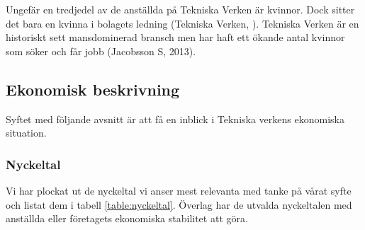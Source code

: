 \documentclass[10pt,a4paper]{article}
\begin{document}
Ungefär en tredjedel av de anställda på Tekniska Verken är
kvinnor. Dock sitter det bara en kvinna i bolagets ledning
(Tekniska Verken, ). Tekniska Verken är en historiskt sett mansdominerad bransch
men har haft ett ökande antal kvinnor som söker och får jobb
(Jacobsson S, 2013).  
\subsection{Ekonomisk beskrivning}
Syftet med följande avsnitt är att få en inblick i Tekniska verkens ekonomiska
situation.

\subsubsection{Nyckeltal}
Vi har plockat ut de nyckeltal vi anser mest relevanta med tanke på vårat syfte och listat dem i tabell \ref{table:nyckeltal}. Överlag har de utvalda nyckeltalen med anställda eller företagets ekonomiska stabilitet att göra.
\end{document}
